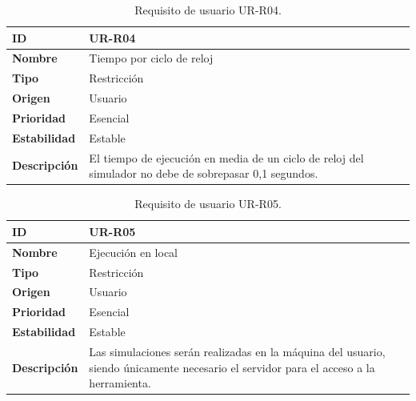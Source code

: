 \begin{center}
\begin{table}[htbp]
\centering
\begin{tabular}{@{}p{2.5cm} p{9cm}@{}} 
\toprule
\textbf{ID} 				& UR-R04 \\
\midrule
\textbf{Nombre} 			& Tiempo por ciclo de reloj \\
\midrule
\textbf{Tipo} 			& Restricción \\
\midrule
\textbf{Origen} 			& Usuario \\
\midrule
\textbf{Prioridad}		& Esencial \\
\midrule
\textbf{Estabilidad} 		& Estable \\
\midrule
\textbf{Descripción} 	& El tiempo de ejecución en media de un ciclo de reloj del simulador no debe de sobrepasar 0,1 segundos. \\
\bottomrule
\end{tabular}
\caption{Requisito de usuario UR-R04.}
\label{tab:urr04}
\end{table}
\end{center}

\begin{center}
\begin{table}[htbp]
\centering
\begin{tabular}{@{}p{2.5cm} p{9cm}@{}} 
\toprule
\textbf{ID} 				& UR-R05 \\
\midrule
\textbf{Nombre} 			& Ejecución en local \\
\midrule
\textbf{Tipo} 			& Restricción \\
\midrule
\textbf{Origen} 			& Usuario \\
\midrule
\textbf{Prioridad}		& Esencial \\
\midrule
\textbf{Estabilidad} 		& Estable \\
\midrule
\textbf{Descripción} 	& Las simulaciones serán realizadas en la máquina del usuario, siendo únicamente necesario el servidor para el acceso a la herramienta. \\
\bottomrule
\end{tabular}
\caption{Requisito de usuario UR-R05.}
\label{tab:urr05}
\end{table}
\end{center}

